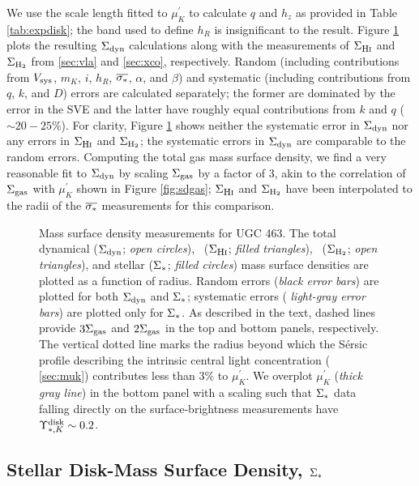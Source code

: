 \documentclass[apj,iop,numberedappendix]{emulateapj}
\begin{document}
We use the scale length fitted to $\mu^{\prime}_K$ to calculate $q$ and $h_z$ as
provided in Table \ref{tab:expdisk}; the band used to define $h_R$ is
insignificant to the result.  Figure \ref{fig:sdd} plots the resulting $\Sigma_{\rm dyn}$
calculations along with the measurements of $\Sigma_{\mbox{\rm \footnotesize H{\scshape i}}}$ and $\Sigma_{\rm H_2}$ from \sects
\ref{sec:vla} and \sect \ref{sec:xco}, respectively.  Random (including
contributions from $V_{\rm sys}$, $m_K$, $i$, $h_R$, $\overline{\sigma_{\ast}}$, $\alpha$, and
$\beta$) and systematic (including contributions from $q$, $k$, and $D$) errors
are calculated separately; the former are dominated by the error in the SVE and
the latter have roughly equal contributions from $k$ and $q$ ($\sim 20-25$\%).
For clarity, Figure \ref{fig:sdd} shows neither the systematic error in
$\Sigma_{\rm dyn}$ nor any errors in $\Sigma_{\mbox{\rm \footnotesize H{\scshape i}}}$ and $\Sigma_{\rm H_2}$; the systematic errors in
$\Sigma_{\rm dyn}$ are comparable to the random errors.  Computing the total gas mass
surface density, we find a very reasonable fit to $\Sigma_{\rm dyn}$ by scaling $\Sigma_{\rm gas}$ by
a factor of 3, akin to the correlation of $\Sigma_{\rm gas}$ with $\mu^{\prime}_K$ shown in
Figure \ref{fig:sdgas}; $\Sigma_{\mbox{\rm \footnotesize H{\scshape i}}}$ and $\Sigma_{\rm H_2}$ have been interpolated to the radii
of the $\overline{\sigma_{\ast}}$ measurements for this comparison.

\begin{figure}
\caption{
%
Mass surface density measurements for UGC 463.  The total dynamical ($\Sigma_{\rm dyn}$;
{\it open circles}), \hone\ ($\Sigma_{\mbox{\rm \footnotesize H{\scshape i}}}$; {\it filled triangles}), \molh\ ($\Sigma_{\rm H_2}$;
{\it open triangles}), and stellar ($\Sigma_{\rm \ast}$; {\it filled circles}) mass surface
densities are plotted as a function of radius.  Random errors ({\it black error
bars}) are plotted for both $\Sigma_{\rm dyn}$ and $\Sigma_{\rm \ast}$; systematic errors ({\it
light-gray error bars}) are plotted only for $\Sigma_{\rm \ast}$.  As described in the text,
dashed lines provide $3\Sigma_{\rm gas}$ and $2\Sigma_{\rm gas}$ in the top and bottom panels,
respectively.  The vertical dotted line marks the radius beyond which the
S{\'e}rsic profile describing the intrinsic central light concentration (\sect
\ref{sec:muk}) contributes less than 3\% to $\mu^{\prime}_K$.  We overplot
$\mu^{\prime}_K$ ({\it thick gray line}) in the bottom panel with a scaling such
that $\Sigma_{\rm \ast}$ data falling directly on the surface-brightness measurements have
$\Upsilon_{\ast,K}^{\rm disk} \sim 0.2$.
%
}
\label{fig:sdd}
\end{figure}

\subsection{Stellar Disk-Mass Surface Density, $\Sigma_{\rm \ast}$}
\label{sec:sds}
\end{document}
